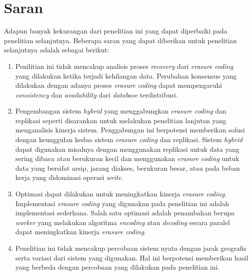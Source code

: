 \section{Saran}
\label{sec:saran}

Adapun banyak kekurangan dari penelitian ini yang dapat diperbaiki pada penelitian selanjutnya. Beberapa saran yang dapat diberikan untuk penelitian selanjutnya adalah sebagai berikut:

\begin{enumerate}
  \item Penilitian ini tidak mencakup analisis proses \textit{recovery} dari \textit{erasure coding} yang dilakukan ketika terjadi kehilangan data. Perubahan konsensus yang dilakukan dengan adanya proses \textit{erasure coding} dapat mempengaruhi \textit{consistency} dan \textit{availability} dari \textit{database} terdistribusi.
  \item Pengembangan sistem \textit{hybrid} yang menggabungkan \textit{erasure coding} dan replikasi seperti disarankan untuk melakukan penelitian lanjutan yang menganalisis kinerja sistem. Penggabungan ini berpotensi memberikan solusi dengan keunggulan kedua sistem \textit{erasure coding} dan replikasi. Sistem \textit{hybrid} dapat digunakan misalnya dengan menggunakan replikasi untuk data yang sering dibaca atau berukuran kecil dan menggunakan \textit{erasure coding} untuk data yang bersifat arsip, jarang diakses, berukuran besar, atau pada beban kerja yang didominasi operasi \textit{write}.
  \item Optimasi dapat dilakukan untuk meningkatkan kinerja \textit{erasure coding}. Implementasi \textit{erasure coding} yang digunakan pada penelitian ini adalah implementasi sederhana. Salah satu optimasi adalah penambahan berupa \textit{worker} yang melakukan algoritma \textit{encoding} atau \textit{decoding} secara paralel dapat meningkatkan kinerja \textit{erasure coding}.
  \item Penelitian ini tidak mencakup percobaan sistem nyata dengan jarak geografis serta variasi dari sistem yang digunakan. Hal ini berpotensi memberikan hasil yang berbeda dengan percobaan yang dilakukan pada penelitian ini.
\end{enumerate}